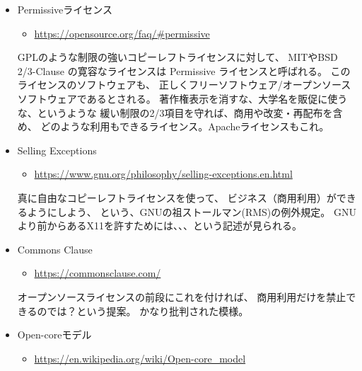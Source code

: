 \documentclass{jsarticle}
\newcommand{\license}{利用許諾}
\newcommand{\derivative}{派生物}
\newcommand{\freesoftware}{フリーソフトウェア}
\newcommand{\opensourcesoftware}{オープンソースソフトウェア}
\newcommand{\freesoftoss}{\freesoftware{}/\opensourcesoftware{}}
\begin{document}
\begin{itemize}
ユーザがプログラムを自由に利用できる権利を守るために、
\derivative{}の\license{}にも強い制限を課し、
1) ソースを公開しなければならない、
2) 同じ\license{}を使わなければならない、とする思想。
\freesoftoss{} の考えの根底にある思想。
copyright -- all rights reserved.（著作権 -- 全ての権利は留保されている）を
揶揄した、
copyleft -- all rights reversed. （コピーレフト -- 全ての右は逆転されている）
に由来する。
ユーザの利用できる権利を守るため、該当プログラムを利用した派生物は全て、
ソースを公開するなどの同じ制限と利用許諾にしなければならない。
GPL（GNU Public License）が有名。
ユーザの権利を守ろうとする余り、プログラムの派生物にも同じ
コピーレフト性という強い制限を求めるため、GPL 汚染やライセンス感染と呼ばれる。
開発物のソースをすべて公開しなければならないという制限が、
多くのビジネスモデルと適合しない、と言われる。

\item Permissiveライセンス
\begin{itemize}
\item \url{https://opensource.org/faq/#permissive}
\end{itemize}

GPLのような制限の強いコピーレフトライセンスに対して、
MITやBSD 2/3-Clause の寛容なライセンスは Permissive ライセンスと呼ばれる。
このライセンスのソフトウェアも、
正しく\freesoftoss{}であるとされる。
著作権表示を消すな、大学名を販促に使うな、というような
緩い制限の2/3項目を守れば、商用や改変・再配布を含め、
どのような利用もできるライセンス。Apacheライセンスもこれ。

\item Selling Exceptions
\begin{itemize}
\item \url{https://www.gnu.org/philosophy/selling-exceptions.en.html}
\end{itemize}

真に自由なコピーレフトライセンスを使って、
ビジネス（商用利用）ができるようにしよう、
という、GNUの祖ストールマン(RMS)の例外規定。
GNUより前からあるX11を許すためには、、、という記述が見られる。

\item Commons Clause
\begin{itemize}
\item \url{https://commonsclause.com/}
\end{itemize}

オープンソースライセンスの前段にこれを付ければ、
商用利用だけを禁止できるのでは？という提案。
かなり批判された模様。

\item Open-coreモデル
\begin{itemize}
\item \url{https://en.wikipedia.org/wiki/Open-core_model}
\end{itemize}


\end{itemize}
\end{document}
